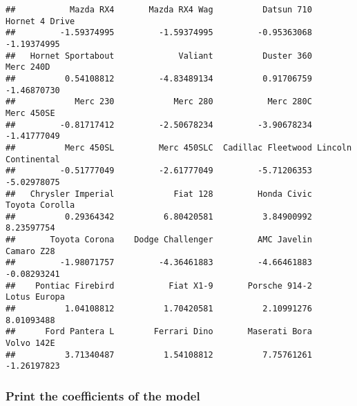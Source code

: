 \documentclass[
]{book}
\newenvironment{Shaded}{\begin{snugshade}}{\end{snugshade}}
\newcommand{\FunctionTok}[1]{\textcolor[rgb]{0.13,0.29,0.53}{\textbf{#1}}}
\newcommand{\NormalTok}[1]{#1}
\newcommand{\OtherTok}[1]{\textcolor[rgb]{0.56,0.35,0.01}{#1}}
\newcommand{\SpecialCharTok}[1]{\textcolor[rgb]{0.81,0.36,0.00}{\textbf{#1}}}
\theoremstyle{definition}
\theoremstyle{definition}
\theoremstyle{definition}
\theoremstyle{definition}
\theoremstyle{remark}
\begin{document}
\begin{Shaded}
\end{Shaded}

\begin{verbatim}
##           Mazda RX4       Mazda RX4 Wag          Datsun 710      Hornet 4 Drive 
##         -1.59374995         -1.59374995         -0.95363068         -1.19374995 
##   Hornet Sportabout             Valiant          Duster 360           Merc 240D 
##          0.54108812         -4.83489134          0.91706759         -1.46870730 
##            Merc 230            Merc 280           Merc 280C          Merc 450SE 
##         -0.81717412         -2.50678234         -3.90678234         -1.41777049 
##          Merc 450SL         Merc 450SLC  Cadillac Fleetwood Lincoln Continental 
##         -0.51777049         -2.61777049         -5.71206353         -5.02978075 
##   Chrysler Imperial            Fiat 128         Honda Civic      Toyota Corolla 
##          0.29364342          6.80420581          3.84900992          8.23597754 
##       Toyota Corona    Dodge Challenger         AMC Javelin          Camaro Z28 
##         -1.98071757         -4.36461883         -4.66461883         -0.08293241 
##    Pontiac Firebird           Fiat X1-9       Porsche 914-2        Lotus Europa 
##          1.04108812          1.70420581          2.10991276          8.01093488 
##      Ford Pantera L        Ferrari Dino       Maserati Bora          Volvo 142E 
##          3.71340487          1.54108812          7.75761261         -1.26197823
\end{verbatim}

\hypertarget{print-the-coefficients-of-the-model}{%
\subsubsection{Print the coefficients of the model}\label{print-the-coefficients-of-the-model}}

\begin{Shaded}
\end{Shaded}
\end{document}
